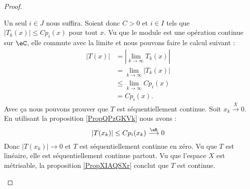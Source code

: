 \begin{proof}
\begin{subproof}
		Un seul \( i\in J\) nous suffira. Soient donc \( C>0\) et \( i\in I\) tels que \( | T_k(x) |\leq C p_i(x)\) pour tout \( x\). Vu que le module est une opération continue sur \( \eC\), elle commute avec la limite et nous pouvons faire le calcul suivant :
		\begin{subequations}
			\begin{align}
				| T(x) | & =| \lim_{k\to \infty} T_k(x) |  \\
				         & =\lim_{k\to \infty} | T_k(x) |  \\
				         & \leq \lim_{k\to \infty} Cp_i(x) \\
				         & =Cp_i(x).
			\end{align}
		\end{subequations}
		Avec ça nous pouvons prouver que \( T\) est séquentiellement continue. Soit \( x_k\stackrel{X}{\longrightarrow}0\). En utilisant la proposition \ref{PropQPzGKVk} nous avons :
		\begin{equation}
			| T(x_k) |\leq C p_i(x_k)\stackrel{\eR}{\longrightarrow}0
		\end{equation}
		Donc \( | T(x_k) |\to 0\) et \( T\) est séquentiellement continue en zéro. Vu que \( T\) est linéaire, elle est séquentiellement continue partout.
		\spitem[Continue]
		Vu que l'espace \( X\) est métrisable, la proposition \ref{PropXIAQSXr} conclut que \( T\) est continue.


\end{subproof}
\end{proof}
